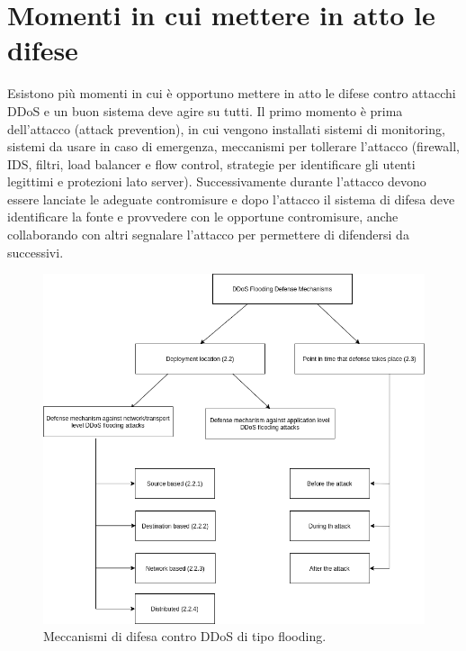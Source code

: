\section{Momenti in cui mettere in atto le difese}

Esistono più momenti in cui è opportuno mettere in atto le difese contro attacchi DDoS e un buon sistema deve agire su tutti.
Il primo momento è prima dell'attacco (attack prevention), in cui vengono installati sistemi di monitoring, sistemi da usare in caso di emergenza, meccanismi per tollerare l'attacco (firewall, IDS, filtri, load balancer e flow control, strategie per identificare gli utenti legittimi e protezioni lato server). Successivamente durante l'attacco devono essere lanciate le adeguate contromisure e dopo l'attacco il sistema di difesa deve identificare la fonte e provvedere con le opportune contromisure, anche collaborando con altri segnalare l'attacco per permettere di difendersi da successivi.

\begin{figure}[]
    \label{fig:albero_difese}
    \includegraphics[width=\hsize]{images/ddos/ddos_flooding_defence.png}
    \caption{Meccanismi di difesa contro DDoS di tipo flooding.}
    \centering
\end{figure}


